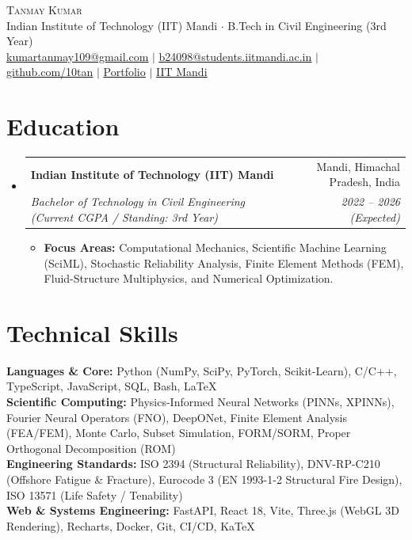 \documentclass[letterpaper,10.8pt]{article}
\makeatletter
\newcommand{\resumeItem}[1]{
  \item\small{
    {#1 \vspace{-1.5pt}}
  }
}
\newcommand{\resumeSubheading}[4]{
  \vspace{-1pt}\item
    \begin{tabular*}{0.98\textwidth}[t]{l@{\extracolsep{\fill}}r}
      \textbf{#1} & #2 \\
      \textit{\small#3} & \textit{\small #4} \\
    \end{tabular*}\vspace{-5pt}
}
\newcommand{\resumeSubHeadingListStart}{\begin{itemize}[leftmargin=0.15in, label={}]}
\newcommand{\resumeSubHeadingListEnd}{\end{itemize}}
\newcommand{\resumeItemListStart}{\begin{itemize}[leftmargin=0.15in, label={\raisebox{0.2ex}{\tiny$\bullet$}}]}
\newcommand{\resumeItemListEnd}{\end{itemize}\vspace{-4pt}}
\makeatother
\begin{document}
\begin{center}
    {\Huge \scshape Tanmay Kumar} \\ \vspace{2pt}
    \small Indian Institute of Technology (IIT) Mandi $\cdot$ B.Tech in Civil Engineering (3rd Year) \\ \vspace{2pt}
    \small 
    \href{mailto:kumartanmay109@gmail.com}{\underline{kumartanmay109@gmail.com}} $|$ 
    \href{mailto:b24098@students.iitmandi.ac.in}{\underline{b24098@students.iitmandi.ac.in}} $|$ 
    \href{https://github.com/10tan}{\underline{github.com/10tan}} $|$ 
    \href{https://10tan.github.io}{\underline{Portfolio}} $|$
    \href{https://www.iitmandi.ac.in}{\underline{IIT Mandi}}
\end{center}
\vspace{-8pt}

\section{Education}
  \resumeSubHeadingListStart
    \resumeSubheading
      {Indian Institute of Technology (IIT) Mandi}{Mandi, Himachal Pradesh, India}
      {Bachelor of Technology in Civil Engineering (Current CGPA / Standing: 3rd Year)}{2022 -- 2026 (Expected)}
      \resumeItemListStart
        \resumeItem{\textbf{Focus Areas:} Computational Mechanics, Scientific Machine Learning (SciML), Stochastic Reliability Analysis, Finite Element Methods (FEM), Fluid-Structure Multiphysics, and Numerical Optimization.}
      \resumeItemListEnd
  \resumeSubHeadingListEnd
\vspace{-6pt}

\section{Technical Skills}
 \begin{itemize}[leftmargin=0.15in, label={}]
    \small{\item{
     \textbf{Languages \& Core:}{ Python (NumPy, SciPy, PyTorch, Scikit-Learn), C/C++, TypeScript, JavaScript, SQL, Bash, \LaTeX} \\
     \textbf{Scientific Computing:}{ Physics-Informed Neural Networks (PINNs, XPINNs), Fourier Neural Operators (FNO), DeepONet, Finite Element Analysis (FEA/FEM), Monte Carlo, Subset Simulation, FORM/SORM, Proper Orthogonal Decomposition (ROM)} \\
     \textbf{Engineering Standards:}{ ISO 2394 (Structural Reliability), DNV-RP-C210 (Offshore Fatigue \& Fracture), Eurocode 3 (EN 1993-1-2 Structural Fire Design), ISO 13571 (Life Safety / Tenability)} \\
     \textbf{Web \& Systems Engineering:}{ FastAPI, React 18, Vite, Three.js (WebGL 3D Rendering), Recharts, Docker, Git, CI/CD, KaTeX}
    }}
 \end{itemize}
\vspace{-6pt}
\end{document}
